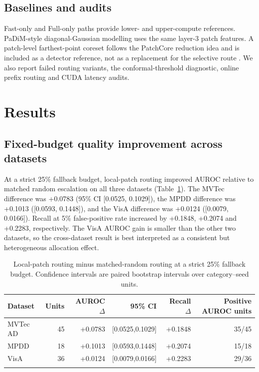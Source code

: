 \documentclass[pdflatex,sn-vancouver-num]{sn-jnl}
\begin{document}
\subsection{Baselines and audits}
Fast-only and Full-only paths provide lower- and upper-compute references. PaDiM-style diagonal-Gaussian modelling uses the same layer-3 patch features. A patch-level farthest-point coreset follows the PatchCore reduction idea and is included as a detector reference, not as a replacement for the selective route \cite{roth2022patchcore}. We also report failed routing variants, the conformal-threshold diagnostic, online prefix routing and CUDA latency audits.

\section{Results}\label{sec:results}

\subsection{Fixed-budget quality improvement across datasets}
At a strict 25\% fallback budget, local-patch routing improved AUROC relative to matched random escalation on all three datasets (Table~\ref{tab:cross}). The MVTec difference was +0.0783 (95\% CI [0.0525, 0.1029]), the MPDD difference was +0.1013 ([0.0593, 0.1448]), and the VisA difference was +0.0124 ([0.0079, 0.0166]). Recall at 5\% false-positive rate increased by +0.1848, +0.2074 and +0.2283, respectively. The VisA AUROC gain is smaller than the other two datasets, so the cross-dataset result is best interpreted as a consistent but heterogeneous allocation effect.

\begin{table}[t]
\caption{Local-patch routing minus matched-random routing at a strict 25\% fallback budget. Confidence intervals are paired bootstrap intervals over category--seed units.}\label{tab:cross}
\begin{tabularx}{\textwidth}{@{}lrrrrr@{}}
\toprule
Dataset & Units & AUROC $\Delta$ & 95\% CI & Recall $\Delta$ & Positive AUROC units\\
\midrule
MVTec AD & 45 & +0.0783 & [0.0525,0.1029] & +0.1848 & 35/45\\
MPDD & 18 & +0.1013 & [0.0593,0.1448] & +0.2074 & 15/18\\
VisA & 36 & +0.0124 & [0.0079,0.0166] & +0.2283 & 29/36\\
\botrule
\end{tabularx}
\end{table}
\end{document}
